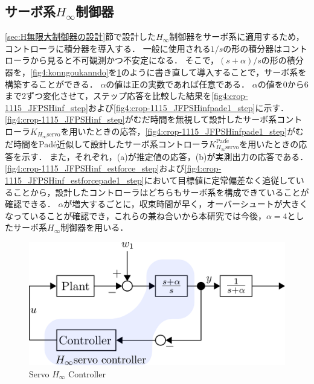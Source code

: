 \subsection{サーボ系$H_\infty$制御器}
\label{sec:サーボ系H無限大制御器}
\ref{sec:H無限大制御器の設計}節で設計した$H_\infty$制御器をサーボ系に適用するため，コントローラに積分器を導入する．
一般に使用される$1/s$の形の積分器はコントローラから見ると不可観測かつ不安定になる\cite{三平満司1997実用的な}．
そこで，$(s+\alpha)/s$の形の積分器を，\figname\ref{fig4:konngoukanndo}を\figname\ref{fig4:servo_hinf}のように書き直して導入することで，サーボ系を構築することができる．
$\alpha$の値は正の実数であれば任意である．
$\alpha$の値を0から6まで2ずつ変化させて，ステップ応答を比較した結果を\figname\ref{fig4:crop-1115_JFPSHinf_step}および\figname\ref{fig4:crop-1115_JFPSHinfpade1_step}に示す．
\figname\ref{fig4:crop-1115_JFPSHinf_step}がむだ時間を無視して設計したサーボ系コントローラ$K_{H_\infty\mathrm{servo}}$を用いたときの応答，\figname\ref{fig4:crop-1115_JFPSHinfpade1_step}がむだ時間をPad\'e近似して設計したサーボ系コントローラ$K_{H_\infty\mathrm{servo}}^{\mathrm{Pad\acute{e}}}$を用いたときの応答を示す．
また，それぞれ，(a)が推定値の応答，(b)が実測出力の応答である．
\figname\ref{fig4:crop-1115_JFPSHinf_estforce_step}および\figname\ref{fig4:crop-1115_JFPSHinf_estforcepade1_step}において目標値に定常偏差なく追従していることから，設計したコントローラはどちらもサーボ系を構成できていることが確認できる．
$\alpha$が増大するごとに，収束時間が早く，オーバーシュートが大きくなっていることが確認でき，これらの兼ね合いから本研究では今後，$\alpha=4$としたサーボ系$H_\infty$制御器を用いる．
\begin{figure}[t]
    \centering
        \includegraphics[keepaspectratio, scale=1.0]{contents/ForceControl/figure/servo_hinf.png}
        \caption{Servo $H_\infty$ Controller}
        \label{fig4:servo_hinf}
\end{figure}


